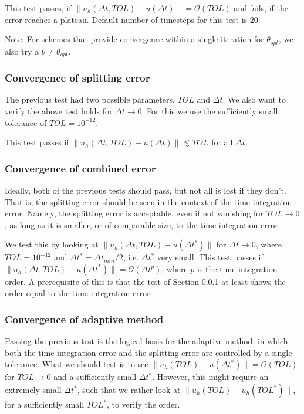 \documentclass[a4paper,10pt]{article}
\begin{document}
This test passes, if $\| u_h(\Delta t, TOL) - u(\Delta t)\| = \mathcal{O}(TOL)$ and fails, if the error reaches a plateau. Default number of timesteps for this test is $20$.

Note: For schemes that provide convergence within a single iteration for $\theta_{opt}$, we also try a $\theta \neq \theta_{opt}$.
% 
\subsubsection{Convergence of splitting error}\label{TEST SPLIT ERROR}
% 
The previous test had two possible parameters, $TOL$ and $\Delta t$. We also want to verify the above test holds for $\Delta t \rightarrow 0$. For this we use the sufficiently small tolerance of $TOL = 10^{-12}$.

This test passes if $\| u_h(\Delta t, TOL) - u(\Delta t)\| \lesssim TOL$ for all $\Delta t$.
%
\subsubsection{Convergence of combined error}\label{TEST COMB ERROR}
% 
Ideally, both of the previous tests should pass, but not all is lost if they don't. That is, the splitting error should be seen in the context of the time-integration error. Namely, the splitting error is acceptable, even if not vanishing for $TOL \rightarrow 0$, as long as it is smaller, or of comparable size, to the time-integration error.

We test this by looking at $\|u_h(\Delta t, TOL) - u(\Delta t^*) \|$ for $\Delta t \rightarrow 0$, where $TOL = 10^{-12}$ and $\Delta t^* = \Delta t_{min}/2$, i.e. $\Delta t^*$ very small. This test passes if $\|u_h(\Delta t, TOL) - u(\Delta t^*) \| = \mathcal{O}(\Delta t^p)$, where $p$ is the time-integration order. A prerequisite of this is that the test of Section \ref{TEST SPLIT ERROR} at least shows the order equal to the time-integration error.
% 
\subsubsection{Convergence of adaptive method}\label{TEST ADAPTIVE}
% 
Passing the previous test is the logical basis for the adaptive method, in which both the time-integration error and the splitting error are controlled by a single tolerance. What we should test is to see $\|u_h(TOL) - u(\Delta t^*) \| = \mathcal{O}(TOL)$ for $TOL \rightarrow 0$ and a sufficiently small $\Delta t^*$. However, this might require an extremely small $\Delta t^*$, such that we rather look at $\|u_h(TOL) - u_h(TOL^*) \|$, for a sufficiently small $TOL^*$, to verify the order.
% 
\end{document}
